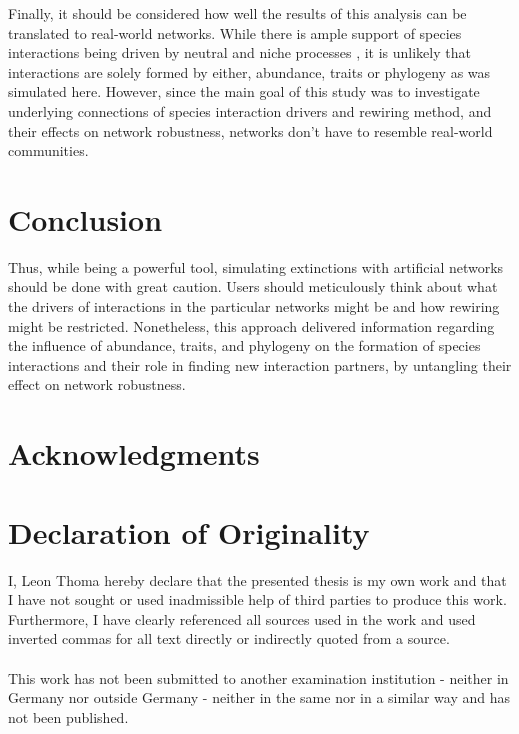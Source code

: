\documentclass[12pt,a4paper]{article}
\begin{document}
Finally, it should be considered how well the results of this analysis can be translated to real-world networks. While there is ample support of species interactions being driven by neutral and niche processes \parencite{Jordano2003, Rezende2007, Vazquez2007, Bluethgen2008}, it is unlikely that interactions are solely formed by either, abundance, traits or phylogeny as was simulated here. However, since the main goal of this study was to investigate underlying
connections of species interaction drivers and rewiring method, and their effects on network robustness, networks don't have to resemble real-world communities.

\section{Conclusion}
Thus, while being a powerful tool, simulating extinctions with artificial networks should be done with great caution. Users should meticulously think about what the drivers of interactions in the particular networks might be and how rewiring might be restricted. Nonetheless, this approach delivered information regarding the influence of abundance, traits, and phylogeny on the formation of species interactions and their role in finding new interaction partners, by untangling their effect on network robustness.
\section{Acknowledgments}
\newpage
\section*{Declaration of Originality}
I, Leon Thoma hereby declare that the presented thesis is my own work and that I have not sought or used inadmissible help of third parties to produce this work. Furthermore, I have clearly referenced all sources used in the work and used inverted commas for all text directly or indirectly quoted from a source.\paragraph{}
This work has not been submitted to another examination institution - neither in Germany nor outside Germany - neither in the same nor in a similar way and has not been published.\paragraph{}
\end{document}
